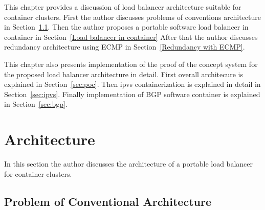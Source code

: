 
This chapter provides a discussion of load balancer architecture suitable for container clusters.
First the author discusses problems of conventions architecture in Section~\ref{Problem of Conventional Architecture}.
Then the author proposes a portable software load balancer in container in Section~\ref{Load balancer in container}
After that the author discusses redundancy architecture using ECMP in Section~\ref{Redundancy with ECMP}. 

This chapter also presents implementation of the proof of the concept system for the proposed load balancer architecture in detail.
First overall architecure is explained in Section~\ref{sec:poc}.
Then ipvs containerization is explained in detail in Section~\ref{sec:ipvs}.
Finally implementation of BGP software container is explained in Section~\ref{sec:bgp}.

\section{Architecture}

In this section the author discusses the architecture of a portable load balancer for container clusters.

\subsection{Problem of Conventional Architecture}\label{Problem of Conventional Architecture}


